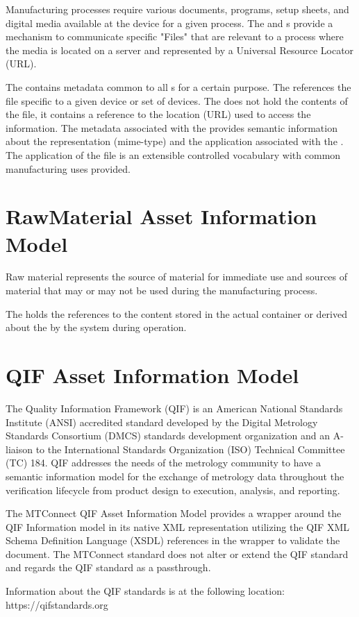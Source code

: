 Manufacturing processes require various documents, programs, setup sheets, and digital media available at the device for a given process. The  and  s provide a mechanism to communicate specific "Files" that are relevant to a process where the media is located on a server and represented by a Universal Resource Locator (URL).

The  contains metadata common to all  s for a certain purpose. The   references the file specific to a given device or set of devices. The   does not hold the contents of the file, it contains a reference to the location (URL) used to access the information. The metadata associated with the  provides semantic information about the representation (mime-type) and the application associated with the . The application of the file is an extensible controlled vocabulary with common manufacturing uses provided.



\section{RawMaterial Asset Information Model}
\label{sec:RawMaterial Asset Information Model}

Raw material represents the source of material for immediate use and sources of material that may or may not be used during the manufacturing process.

The   holds the references to the content stored in the actual  container or derived about the  by the system during operation.



\section{QIF Asset Information Model}
\label{sec:QIF Asset Information Model}

The Quality Information Framework (QIF) is an American National Standards Institute (ANSI) accredited standard developed by the Digital Metrology Standards Consortium (DMCS) standards development organization and an A-liaison to the International Standards Organization (ISO) Technical Committee (TC) 184. QIF addresses the needs of the metrology community to have a semantic information model for the exchange of metrology data throughout the verification lifecycle from product design to execution, analysis, and reporting.

The MTConnect QIF Asset Information Model provides a wrapper around the QIF Information model in its native XML representation utilizing the QIF XML Schema Definition Language (XSDL) references in the wrapper to validate the document. The MTConnect standard does not alter or extend the QIF standard and regards the QIF standard as a passthrough.

Information about the QIF standards is at the following location: https://qifstandards.org


